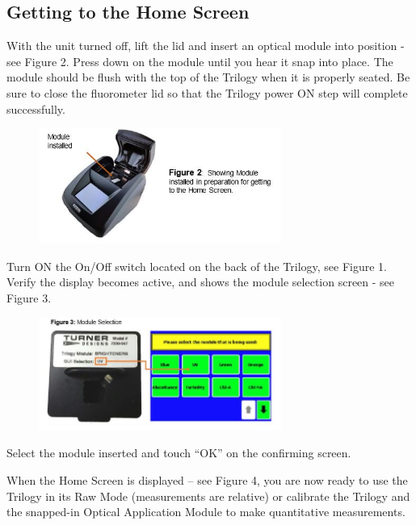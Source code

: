 \documentclass[12pt]{../SOP3_beta}
\begin{document}
\subsection{Getting to the Home Screen}

\NP  With the unit turned off, lift the lid and insert an optical module into position - see Figure 2.  Press down on the module until you hear it snap into place.  The module should be flush with the top of the Trilogy when it is properly seated.   Be sure to close the fluorometer lid so that the Trilogy power ON step will complete successfully. 

\begin{figure}
\includegraphics[width=300]{"Capture2.JPG"}
\end{figure}

\NP Turn ON the On/Off switch located on the back of the Trilogy, see Figure 1.  Verify the display becomes active, and shows the module selection screen - see Figure 3. 
 \begin{figure}
\includegraphics[width=300]{"Capture3.JPG"}
\end{figure}

\NP Select the module inserted and touch “OK” on the confirming screen. 
 
\NP When the Home Screen is displayed – see Figure 4, you are now ready to use the Trilogy in its Raw Mode (measurements are relative) or calibrate the Trilogy and the snapped-in Optical Application Module to make quantitative measurements.
\end{document}
